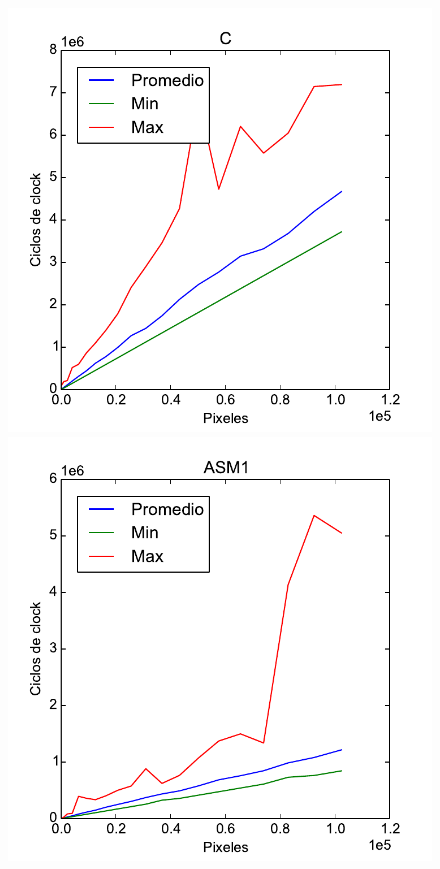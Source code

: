 \begin{figure}[h!]
	\centering
	\includegraphics[scale=0.45]{images/c_merge}
	\includegraphics[scale=0.45]{images/asm1_merge}

\end{figure}
